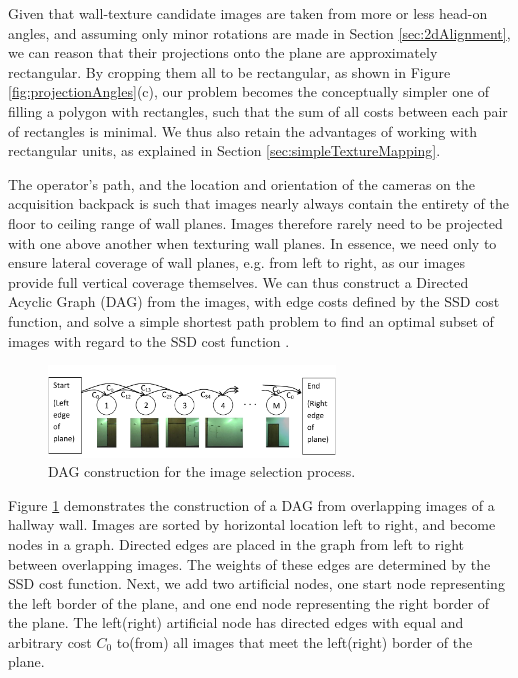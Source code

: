 \documentclass[]{spie}  %
\begin{document}
Given that wall-texture candidate images are taken from more or less
head-on angles, and assuming only minor rotations are made in Section
\ref{sec:2dAlignment}, we can reason that their projections onto the
plane are approximately rectangular. By cropping them all to be
rectangular, as shown in Figure \ref{fig:projectionAngles}(c), our
problem becomes the conceptually simpler one of filling a polygon with
rectangles, such that the sum of all costs between each pair of
rectangles is minimal. We thus also retain the advantages of working
with rectangular units, as explained in Section
\ref{sec:simpleTextureMapping}.

The operator's path, and the location and orientation of the cameras
on the acquisition backpack is such that images nearly always contain
the entirety of the floor to ceiling range of wall planes. Images
therefore rarely need to be projected with one above another when
texturing wall planes. In essence, we need only to ensure lateral
coverage of wall planes, e.g. from left to right, as our images
provide full vertical coverage themselves. We can thus construct a
Directed Acyclic Graph (DAG) from the images, with edge costs defined
by the SSD cost function, and solve a simple shortest path problem to
find an optimal subset of images with regard to the SSD cost function
\cite{dijkstra}.

\begin{figure}
  \centering
  \includegraphics[width=3in]{dagCreation.pdf}
  \caption{DAG construction for the image selection process. \\}
  \label{fig:dagCreation}
\end{figure}

Figure \ref{fig:dagCreation} demonstrates the construction of a DAG
from overlapping images of a hallway wall. Images are sorted by
horizontal location left to right, and become nodes in a
graph. Directed edges are placed in the graph from left to right
between overlapping images. The weights of these edges are determined
by the SSD cost function. Next, we add two artificial nodes, one start
node representing the left border of the plane, and one end node
representing the right border of the plane. The left(right) artificial
node has directed edges with equal and arbitrary cost $C_0$ to(from)
all images that meet the left(right) border of the plane.
\end{document}
